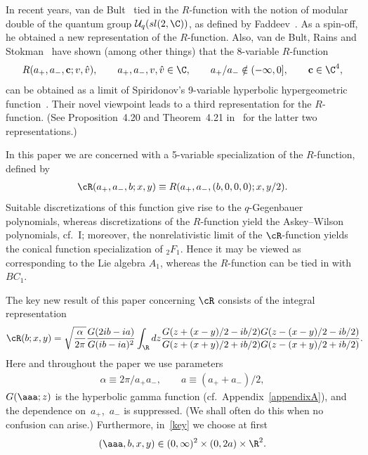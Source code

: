 \documentclass[pdftex]{sigma}
\numberwithin{equation}{section}
\begin{document}
In recent years, van de Bult~\cite{bult} tied in the $R$-function with the notion of modular double of the quantum group ${\mathcal U}_q(sl(2,\C))$, as def\/ined by Faddeev~\cite{fadd1}. As a spin-of\/f, he obtained a new representation of the $R$-function. Also,
van de Bult, Rains and Stokman~\cite{bust} have shown (among other things) that the 8-variable $R$-function
\begin{gather}\label{Rdef}
R(a_{+},a_{-},{\bf c};v,\hat{v}),\qquad a_{+}, a_{-},v,\hat{v}\in\C,\qquad a_{+}/a_{-}\notin (-\infty,0],\qquad {\bf c}\in\C^4,
\end{gather}
can be obtained as a limit of Spiridonov's 9-variable hyperbolic hypergeometric function~\cite{spir}. Their novel viewpoint leads to a third representation for the $R$-function. (See Proposition~4.20 and Theorem~4.21 in~\cite{bust} for the latter two representations.)

In this paper we are concerned with a 5-variable specialization of the $R$-function, def\/ined by
\begin{gather}\label{cRdef}
\cR(a_{+},a_{-},b;x,y)\equiv R(a_{+},a_{-},(b,0,0,0);x,y/2).
\end{gather}
Suitable discretizations of this function give rise to the $q$-Gegenbauer polynomials, whereas discretizations of the $R$-function yield the Askey--Wilson polynomials, cf.~I; moreover, the nonrelativistic limit of the $\cR$-function yields the conical function specialization of $_2F_1$. Hence it may be viewed as corresponding to the Lie algebra $A_1$, whereas the $R$-function can be tied in with $BC_1$.

The key new result of this paper concerning $\cR$ consists of the integral representation
\begin{gather}\label{key}
\cR(b;x,y)=\sqrt{\frac{\alpha}{2\pi}}\frac{G(2ib-ia)}{G(ib-ia)^2}\int_{\R}dz \frac{G(z+ (x-y)/2-ib/2)G(z- (x-y)/2-ib/2)}{G(z+ (x+y)/2+ib/2)G(z- (x+y)/2+ib/2)}.
\!\!\!
\end{gather}
Here and throughout the paper we use parameters
\begin{gather}\label{aconv}
\alpha\equiv 2\pi/a_+a_-,\qquad a\equiv (a_++a_-)/2,
\end{gather}
$G(\aaa;z)$ is the hyperbolic gamma function (cf.~Appendix~\ref{appendixA}), and  the dependence on~$a_{+}$,~$a_{-}$ is suppressed. (We shall often do this when no confusion can arise.) Furthermore, in~\eqref{key} we choose at f\/irst
\begin{gather}\label{first}
(\aaa,b,x,y)\in(0,\infty)^2\times(0,2a)\times\R^2.
\end{gather}
\end{document}
